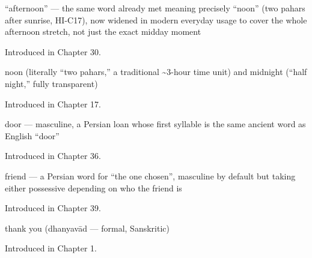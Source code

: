\noindent\begin{minipage}[t]{\linewidth}
\raggedright
\textbf{}\par
\small \textquotedblleft{}afternoon\textquotedblright{} — the same word already met meaning precisely \textquotedblleft{}noon\textquotedblright{} (two pahars after sunrise, HI-C17), now widened in modern everyday usage to cover the whole afternoon stretch, not just the exact midday moment\par
\footnotesize Introduced in Chapter 30.
\end{minipage}\par\medskip

\noindent\begin{minipage}[t]{\linewidth}
\raggedright
\textbf{  }\par
\small noon (literally \textquotedblleft{}two pahars,\textquotedblright{} a traditional \textasciitilde{}3-hour time unit) and midnight (\textquotedblleft{}half night,\textquotedblright{} fully transparent)\par
\footnotesize Introduced in Chapter 17.
\end{minipage}\par\medskip

\noindent\begin{minipage}[t]{\linewidth}
\raggedright
\textbf{}\par
\small door — masculine, a Persian loan whose first syllable is the same ancient word as English \textquotedblleft{}door\textquotedblright{}\par
\footnotesize Introduced in Chapter 36.
\end{minipage}\par\medskip

\noindent\begin{minipage}[t]{\linewidth}
\raggedright
\textbf{}\par
\small friend — a Persian word for \textquotedblleft{}the one chosen\textquotedblright{}, masculine by default but taking either possessive depending on who the friend is\par
\footnotesize Introduced in Chapter 39.
\end{minipage}\par\medskip

\noindent\begin{minipage}[t]{\linewidth}
\raggedright
\textbf{}\par
\small thank you (dhanyavād — formal, Sanskritic)\par
\footnotesize Introduced in Chapter 1.
\end{minipage}\par\medskip

